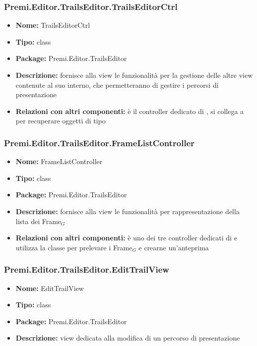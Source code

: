 \subsubsection{Premi.Editor.TrailsEditor.TrailsEditorCtrl}
\begin{itemize}
  \item \textbf{Nome:} TrailsEditorCtrl
  \item \textbf{Tipo:} class
  \item \textbf{Package:} Premi.Editor.TrailsEditor
  \item \textbf{Descrizione:} fornisce alla view le funzionalità per la gestione delle altre view contenute al suo interno, che permetteranno di gestire i percorsi di presentazione
  \item \textbf{Relazioni con altri componenti:}  è il controller dedicato di   , si collega a  per recuperare oggetti di tipo 
\end{itemize}
\subsubsection{Premi.Editor.TrailsEditor.FrameListController}
\begin{itemize}
  \item \textbf{Nome:} FrameListController
  \item \textbf{Tipo:} class
  \item \textbf{Package:} Premi.Editor.TrailsEditor
  \item \textbf{Descrizione:} fornisce alla view  le funzionalità per rappresentazione della lista dei Frame$_G$
  \item \textbf{Relazioni con altri componenti:} è uno dei tre controller dedicati di    e utilizza la classe  per prelevare i Frame$_G$ e crearne un'anteprima
\end{itemize}
\subsubsection{Premi.Editor.TrailsEditor.EditTrailView}
\begin{itemize}
  \item \textbf{Nome:} EditTrailView
  \item \textbf{Tipo:} class
  \item \textbf{Package:} Premi.Editor.TrailsEditor
  \item \textbf{Descrizione:} view dedicata alla modifica di un percorso di presentazione
\end{itemize}
